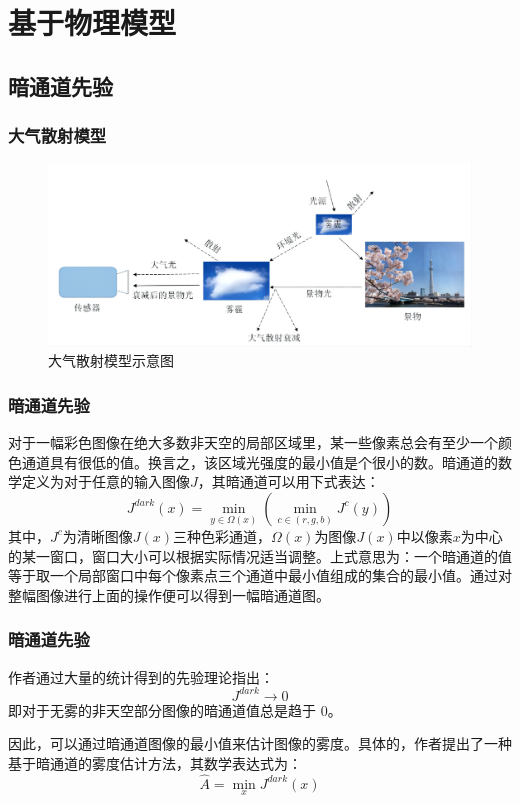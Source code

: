 
    \section{基于物理模型}

    \subsection{暗通道先验}

    \begin{frame}
      \frametitle{大气散射模型}
      \begin{figure}
        \centering
        \includegraphics[width=\textwidth]{figures/pic8.png}
        \caption{大气散射模型示意图}
      \end{figure}
    \end{frame}

    \begin{frame}
      \frametitle{暗通道先验}
      对于一幅彩色图像在绝大多数非天空的局部区域里，某一些像素总会有至少一个颜色通道具有很低的值。换言之，该区域光强度的最小值是个很小的数。暗通道的数学定义为对于任意的输入图像$J$，其暗通道可以用下式表达：
      \begin{equation}
        J^{dark}(x)=\min _{y \in \Omega(x)}\left(\min _{c \in(r, g, b)} J^{c}(y)\right)
      \end{equation}
      其中，$J^c$为清晰图像$J(x)$三种色彩通道，$\Omega(x)$为图像$J(x)$中以像素$x$为中心的某一窗口，窗口大小可以根据实际情况适当调整。上式意思为：一个暗通道的值等于取一个局部窗口中每个像素点三个通道中最小值组成的集合的最小值。通过对整幅图像进行上面的操作便可以得到一幅暗通道图。
    
    \end{frame}

    \begin{frame}
      \frametitle{暗通道先验}
      作者通过大量的统计得到的先验理论指出：
      \begin{equation}
        J^{dark} \to 0
      \end{equation}
      即对于无雾的非天空部分图像的暗通道值总是趋于 0。
        
      因此，可以通过暗通道图像的最小值来估计图像的雾度。具体的，作者提出了一种基于暗通道的雾度估计方法，其数学表达式为：
      \begin{equation}
        \hat{A}=\min _{x} J^{dark}(x)
      \end{equation}
    \end{frame}


